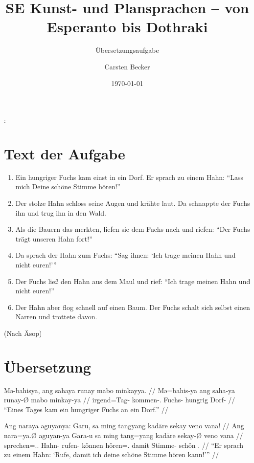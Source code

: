 \documentclass[12pt,paper=a4]{scrartcl}
\author{Carsten Becker}
\title{SE Kunst- und Plansprachen -- von Esperanto bis Dothraki}
\subtitle{Übersetzungsaufgabe}
\date{\today} %
\newcommand{\TsgM}{{\Tsg}.{\M}}
\newenvironment{mytitle}{
    \hfill
    \begin{minipage}{0.667\textwidth}
	\vspace{\baselineskip}
	\begin{center}
	    \Large
	    \sffamily\bfseries
	    \makeatletter
}{
	    \makeatother
	\end{center}
	\vspace{1em}
    \end{minipage}
    \hfill
}
\begin{document}

\begin{mytitle}
    \@title: \@subtitle\footnotemark
\end{mytitle}

\section{Text der Aufgabe}

\begin{enumerate}[noitemsep]
\item Ein hungriger Fuchs kam einst in ein Dorf. Er sprach zu einem Hahn: \enquote{Lass mich Deine schöne Stimme hören!}
\item Der stolze Hahn schloss seine Augen und krähte laut. Da schnappte der Fuchs ihn und trug ihn in den Wald.
\item Als die Bauern das merkten, liefen sie dem Fuchs nach und riefen: \enquote{Der Fuchs trägt unseren Hahn fort!}
\item Da sprach der Hahn zum Fuchs: \enquote{Sag ihnen: \enquote{Ich trage meinen Hahn und nicht euren!}}
\item Der Fuchs ließ den Hahn aus dem Maul und rief: \enquote{Ich trage meinen Hahn und nicht euren!}
\item Der Hahn aber flog schnell auf einen Baum. Der Fuchs schalt sich selbst einen Narren und trottete davon.
\end{enumerate}

(Nach Äsop)

\section{Übersetzung}

\pex %
\a\begingl
	\gla Mə-bahisya, ang sahaya runay mabo minkayya. //
	\glb Mə=bahis-ya ang saha-ya runay-Ø mabo minkay-ya //
	\glc irgend=Tag-\Loc{} \AgtT{} kommen-\TsgM{} Fuchs-\Top{} hungrig Dorf-\Loc{} //
	\glft \enquote{Eines Tages kam ein hungriger Fuchs an ein Dorf.} //
\endgl

\a\label{ex:umformuliert}\begingl[glspace=0.25em]
	\gla Ang naraya aguyanya: Garu, sa ming tangyang kadāre sekay veno vana! //
	\glb Ang nara=ya.Ø aguyan-ya Gara-u sa ming tang=yang kadāre sekay-Ø veno vana //
	\glc \AgtT{} sprechen=\TsgM{}.\Top{} Hahn-\Loc{} rufen-\Imp{} \PatT{} können hören=\Fsg{}.\Aarg{} damit Stimme-\Top{} schön \Ssg{}.\Gen{} //
	\glft \enquote{Er sprach zu einem Hahn: \enquote{Rufe, damit ich deine schöne Stimme hören kann!}} //
\endgl
\end{document}
